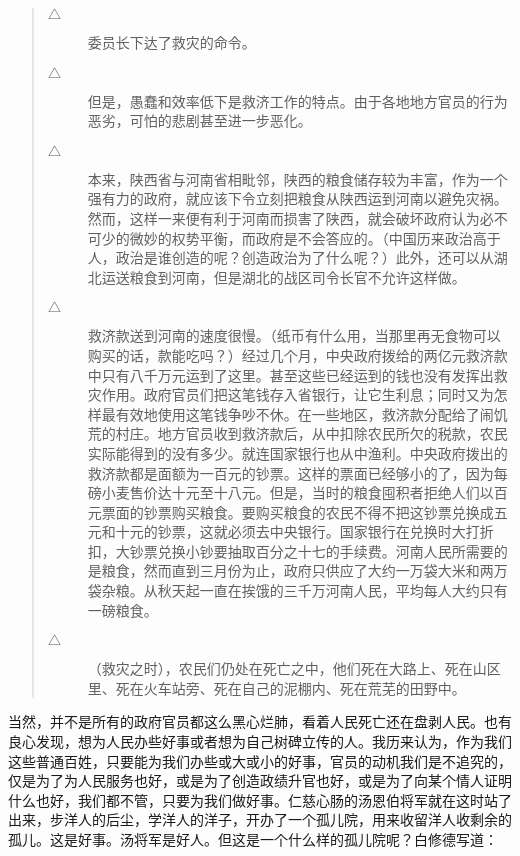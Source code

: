 \begin{quote}
	\begin{description}
		\item [$\bigtriangleup$] 委员长下达了救灾的命令。\\
		
		\item [$\bigtriangleup$] 但是，愚蠢和效率低下是救济工作的特点。由于各地地方官员的行为恶劣，可怕的悲剧甚至进一步恶化。\\
		
		\item [$\bigtriangleup$] 本来，陕西省与河南省相毗邻，陕西的粮食储存较为丰富，作为一个强有力的政府，就应该下令立刻把粮食从陕西运到河南以避免灾祸。然而，这样一来便有利于河南而损害了陕西，就会破坏政府认为必不可少的微妙的权势平衡，而政府是不会答应的。（中国历来政治高于人，政治是谁创造的呢？创造政治为了什么呢？）此外，还可以从湖北运送粮食到河南，但是湖北的战区司令长官不允许这样做。\\
		
		\item [$\bigtriangleup$] 救济款送到河南的速度很慢。（纸币有什么用，当那里再无食物可以购买的话，款能吃吗？）经过几个月，中央政府拨给的两亿元救济款中只有八千万元运到了这里。甚至这些已经运到的钱也没有发挥出救灾作用。政府官员们把这笔钱存入省银行，让它生利息；同时又为怎样最有效地使用这笔钱争吵不休。在一些地区，救济款分配给了闹饥荒的村庄。地方官员收到救济款后，从中扣除农民所欠的税款，农民实际能得到的没有多少。就连国家银行也从中渔利。中央政府拨出的救济款都是面额为一百元的钞票。这样的票面已经够小的了，因为每磅小麦售价达十元至十八元。但是，当时的粮食囤积者拒绝人们以百元票面的钞票购买粮食。要购买粮食的农民不得不把这钞票兑换成五元和十元的钞票，这就必须去中央银行。国家银行在兑换时大打折扣，大钞票兑换小钞要抽取百分之十七的手续费。河南人民所需要的是粮食，然而直到三月份为止，政府只供应了大约一万袋大米和两万袋杂粮。从秋天起一直在挨饿的三千万河南人民，平均每人大约只有一磅粮食。\\
		
		\item [$\bigtriangleup$] （救灾之时），农民们仍处在死亡之中，他们死在大路上、死在山区里、死在火车站旁、死在自己的泥棚内、死在荒芜的田野中。\\
	\end{description}
\end{quote}

当然，并不是所有的政府官员都这么黑心烂肺，看着人民死亡还在盘剥人民。也有良心发现，想为人民办些好事或者想为自己树碑立传的人。我历来认为，作为我们这些普通百姓，只要能为我们办些或大或小的好事，官员的动机我们是不追究的，仅是为了为人民服务也好，或是为了创造政绩升官也好，或是为了向某个情人证明什么也好，我们都不管，只要为我们做好事。仁慈心肠的汤恩伯将军就在这时站了出来，步洋人的后尘，学洋人的洋子，开办了一个孤儿院，用来收留洋人收剩余的孤儿。这是好事。汤将军是好人。但这是一个什么样的孤儿院呢？白修德写道：\\

